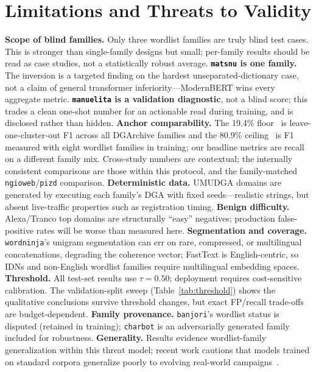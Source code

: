\documentclass[conference]{IEEEtran}
\begin{document}
\section{Limitations and Threats to Validity}
\label{sec:limitations}
\textbf{Scope of blind families.} Only three wordlist families are truly blind test cases. This is stronger than single-family designs but small; per-family results should be read as case studies, not a statistically robust average. \textbf{\texttt{matsnu} is one family.} The inversion is a targeted finding on the hardest unseparated-dictionary case, not a claim of general transformer inferiority---ModernBERT wins every aggregate metric. \textbf{\texttt{manuelita} is a validation diagnostic}, not a blind score; this trades a clean one-shot number for an actionable read during training, and is disclosed rather than hidden. \textbf{Anchor comparability.} The 19.4\% floor~\cite{drichel2022} is leave-one-cluster-out F1 across all DGArchive families and the 80.9\% ceiling~\cite{leyva2026} is F1 measured with eight wordlist families in training; our headline metrics are recall on a different family mix. Cross-study numbers are contextual; the internally consistent comparisons are those within this protocol, and the family-matched \texttt{ngioweb}/\texttt{pizd} comparison. \textbf{Deterministic data.} UMUDGA domains are generated by executing each family's DGA with fixed seeds---realistic strings, but absent live-traffic properties such as registration timing. \textbf{Benign difficulty.} Alexa/Tranco top domains are structurally ``easy'' negatives; production false-positive rates will be worse than measured here. \textbf{Segmentation and coverage.} \texttt{wordninja}'s unigram segmentation can err on rare, compressed, or multilingual concatenations, degrading the coherence vector; FastText is English-centric, so IDNs and non-English wordlist families require multilingual embedding spaces. \textbf{Threshold.} All test-set results use $\tau = 0.50$; deployment requires cost-sensitive calibration. The validation-split sweep (Table~\ref{tab:threshold}) shows the qualitative conclusions survive threshold changes, but exact FP/recall trade-offs are budget-dependent. \textbf{Family provenance.} \texttt{banjori}'s wordlist status is disputed (retained in training); \texttt{charbot} is an adversarially generated family~\cite{peck2019} included for robustness. \textbf{Generality.} Results evidence wordlist-family generalization within this threat model; recent work cautions that models trained on standard corpora generalize poorly to evolving real-world campaigns~\cite{cebere2024}.
\end{document}
